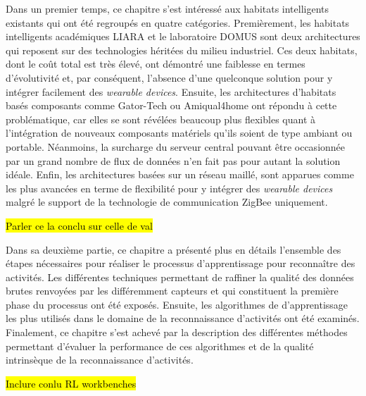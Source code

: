 Dans un premier temps, ce chapitre s'est intéressé aux habitats intelligents existants qui ont été regroupés en quatre catégories. Premièrement, les habitats intelligents académiques \acs{LIARA} et le laboratoire \acs{DOMUS} sont deux architectures qui reposent sur des technologies héritées du milieu industriel. Ces deux habitats, dont le coût total est très élevé, ont démontré une faiblesse en termes d'évolutivité et, par conséquent, l'absence d'une quelconque solution pour y intégrer facilement des \textit{wearable devices}. Ensuite, les architectures d'habitats basés composants comme Gator-Tech ou Amiqual4home ont répondu à cette problématique, car elles se sont révélées beaucoup plus flexibles quant à l'intégration de nouveaux composants matériels qu'ils soient de type ambiant ou portable. Néanmoins, la surcharge du serveur central pouvant être occasionnée par un grand nombre de flux de données n'en fait pas pour autant la solution idéale. Enfin, les architectures basées sur un réseau maillé, sont apparues comme les plus avancées en terme de flexibilité pour y intégrer des \textit{wearable devices} malgré le support de la technologie de communication ZigBee uniquement.

\hl{Parler ce la conclu sur celle de val}

Dans sa deuxième partie, ce chapitre a présenté plus en détails l'ensemble des étapes nécessaires pour réaliser le processus d'apprentissage pour reconnaître des activités. Les différentes techniques permettant de raffiner la qualité des données brutes renvoyées par les différemment capteurs et qui constituent la première phase du processus ont été exposés. Ensuite, les algorithmes de d'apprentissage les plus utilisés dans le domaine de la reconnaissance d'activités ont été examinés. Finalement, ce chapitre s'est achevé par la description des différentes méthodes permettant d'évaluer la performance de ces algorithmes et de la qualité intrinsèque de la reconnaissance d'activités.

\hl{Inclure conlu RL workbenches}
